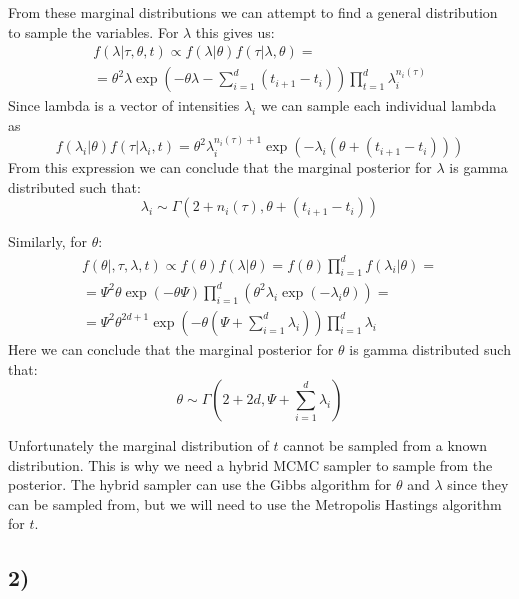\documentclass[a4paper]{article}
\begin{document}
From these marginal distributions we can attempt to find a general distribution to sample the variables. For $\lambda$ this gives us:
\begin{equation}
    \begin{gathered}
        f(\lambda | \tau, \theta, t) \propto f(\lambda|\theta)f(\tau|\lambda,\theta) = \\ = \theta^2\lambda\exp(-\theta\lambda-\sum_{i=1}^d(t_{i+1}-t_i))\prod_{t=1}^d\lambda_i^{n_i(\tau)}
    \end{gathered}
\end{equation}
Since lambda is a vector of intensities $\lambda_i$ we can sample each individual lambda as 
\begin{equation}
    f(\lambda_i|\theta)f(\tau|\lambda_i,t) = \theta^2\lambda_i^{n_i(\tau)+1}\exp(-\lambda_i(\theta + (t_{i+1}-t_i)))
\end{equation}
From this expression we can conclude that the marginal posterior for $\lambda$ is gamma distributed such that:
\begin{equation}
    \lambda_i \sim \Gamma(2+n_i(\tau), \theta + (t_{i+1} - t_i))
\end{equation}

Similarly, for $\theta$:
\begin{equation}
    \begin{gathered}
        f(\theta|, \tau, \lambda, t) \propto f(\theta)f(\lambda|\theta) = f(\theta)\prod_{i=1}^d f(\lambda_i|\theta)= \\
        = \Psi^2\theta\exp(-\theta\Psi)\prod_{i=1}^d(\theta^2\lambda_i\exp(-\lambda_i\theta)) = \\
        = \Psi^2\theta^{2d+1}\exp(-\theta(\Psi+\sum_{i=1}^d\lambda_i))\prod_{i=1}^d\lambda_i
    \end{gathered}
\end{equation}
Here we can conclude that the marginal posterior for $\theta$ is gamma distributed such that:
\begin{equation}
    \theta \sim \Gamma(2+2d, \Psi+\sum_{i=1}^d\lambda_i)
\end{equation}

Unfortunately the marginal distribution of $t$ cannot be sampled from a known distribution. This is why we need a hybrid MCMC sampler to sample from the posterior. The hybrid sampler can use the Gibbs algorithm for $\theta$ and $\lambda$ since they can be sampled from, but we will need to use the Metropolis Hastings algorithm for $t$.

\subsection*{2)}
\end{document}
